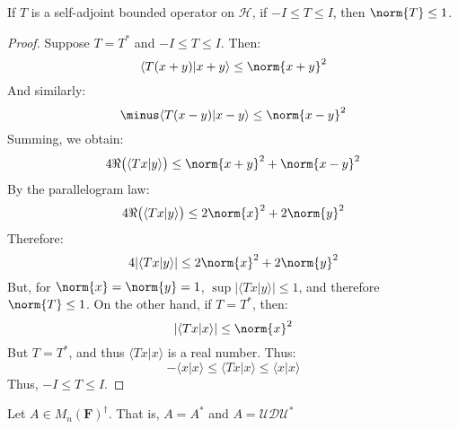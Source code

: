         \begin{theorem}
            If $T$ is a self-adjoint bounded operator on
            $\mathcal{H}$, if $\minus{I}\leq{T}\leq{I}$, then
            $\norm{T}\leq{1}$.
        \end{theorem}
        \begin{proof}
            Suppose $T=T^{*}$ and $\minus{I}\leq{T}\leq{I}$.
            Then:
            \begin{equation}
                \langle{T(x+y)|x+y}\rangle
                \leq\norm{x+y}^{2}
            \end{equation}
            And similarly:
            \begin{equation}
                \minus\langle{T(x-y)|x-y}\rangle
                \leq\norm{x-y}^{2}
            \end{equation}
            Summing, we obtain:
            \begin{equation}
                4\Re\big(\langle{Tx|y}\rangle\big)
                \leq\norm{x+y}^{2}+\norm{x-y}^{2}
            \end{equation}
            By the parallelogram law:
            \begin{equation}
                4\Re\big(\langle{Tx|y}\rangle\big)
                \leq{2}\norm{x}^{2}+2\norm{y}^{2}
            \end{equation}
            Therefore:
            \begin{equation}
                4|\langle{Tx|y}\rangle|
                \leq{2}\norm{x}^{2}+2\norm{y}^{2}
            \end{equation}
            But, for $\norm{x}=\norm{y}=1$,
            $\sup|\langle{Tx|y}\rangle|\leq{1}$, and therefore
            $\norm{T}\leq{1}$. On the other hand, if
            $T=T^{*}$, then:
            \begin{equation}
                |\langle{Tx|x}\rangle|\leq\norm{x}^{2}
            \end{equation}
            But $T=T^{*}$, and thus
            $\langle{Tx|x}\rangle$ is a real number. Thus:
            \begin{equation}
                \minus\langle{x|x}\rangle
                \leq\langle{Tx|x}\rangle
                \leq\langle{x|x}\rangle
            \end{equation}
            Thus, $\minus{I}\leq{T}\leq{I}$.
        \end{proof}
        Let $A\in{M}_{n}(\mathbf{F})^{\dagger}$. That is,
        $A=A^{*}$ and $A=\mathcal{U}\mathcal{D}\mathcal{U}^{*}$

